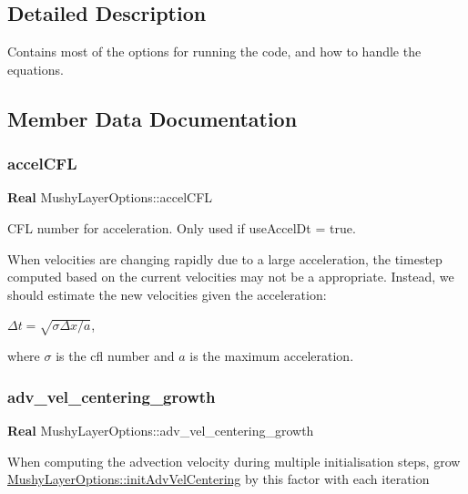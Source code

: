 \subsection{Detailed Description}
Contains most of the options for running the code, and how to handle the equations. 

\subsection{Member Data Documentation}
\mbox{\label{struct_mushy_layer_options_ab64711234784b285045c7dfb904231f3}} 
\subsubsection{\texorpdfstring{accel\+C\+FL}{accelCFL}}
{\footnotesize\ttfamily \textbf{ Real} Mushy\+Layer\+Options\+::accel\+C\+FL}



C\+FL number for acceleration. Only used if use\+Accel\+Dt = true. 

When velocities are changing rapidly due to a large acceleration, the timestep computed based on the current velocities may not be a appropriate. Instead, we should estimate the new velocities given the acceleration\+:

$ \Delta t = \sqrt{\sigma \Delta x / a} $,

where $ \sigma $ is the cfl number and $ a$ is the maximum acceleration. \mbox{\label{struct_mushy_layer_options_a923817c4dd1baeb506c20cd081256175}} 
\subsubsection{\texorpdfstring{adv\+\_\+vel\+\_\+centering\+\_\+growth}{adv\_vel\_centering\_growth}}
{\footnotesize\ttfamily \textbf{ Real} Mushy\+Layer\+Options\+::adv\+\_\+vel\+\_\+centering\+\_\+growth}

When computing the advection velocity during multiple initialisation steps, grow \hyperlink{struct_mushy_layer_options_abb4bbe1b7dc2088154775ac0915cd8e9}{Mushy\+Layer\+Options\+::init\+Adv\+Vel\+Centering} by this factor with each iteration \mbox{\label{struct_mushy_layer_options_abf28d877dea7de52109802ad51f75fa2}} 
